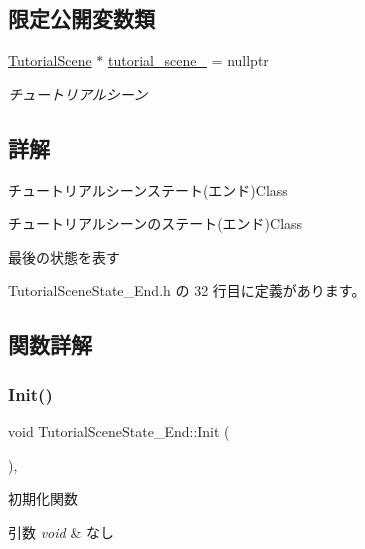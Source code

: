 \subsection*{限定公開変数類}
\begin{DoxyCompactItemize}
\item 
\mbox{\hyperlink{class_tutorial_scene}{Tutorial\+Scene}} $\ast$ \mbox{\hyperlink{class_tutorial_scene_state___end_a68f36e80b530182a5b5d835425b7e829}{tutorial\+\_\+scene\+\_\+}} = nullptr
\begin{DoxyCompactList}\small\item\em チュートリアルシーン \end{DoxyCompactList}\end{DoxyCompactItemize}


\subsection{詳解}
チュートリアルシーンステート(エンド)Class 

チュートリアルシーンのステート(エンド)Class

最後の状態を表す 

 Tutorial\+Scene\+State\+\_\+\+End.\+h の 32 行目に定義があります。



\subsection{関数詳解}
\mbox{\label{class_tutorial_scene_state___end_a572e5687140ff5ac43789f90462c05a5}} 
\subsubsection{\texorpdfstring{Init()}{Init()}}
{\footnotesize\ttfamily void Tutorial\+Scene\+State\+\_\+\+End\+::\+Init (\begin{DoxyParamCaption}{ }\end{DoxyParamCaption})\hspace{0.3cm}{\ttfamily [override]}, {\ttfamily [virtual]}}



初期化関数 


\begin{DoxyParams}{引数}
{\em void} & なし \\
\hline
\end{DoxyParams}

